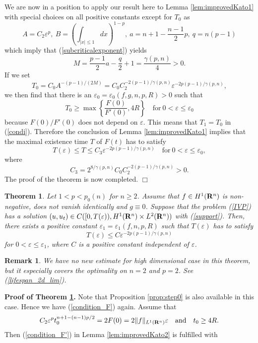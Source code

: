 \documentclass[a4paper,12pt]{article}
\numberwithin{equation}{section}
\def\R{{\bf R}}
\def\e{{\varepsilon}}
\newtheorem{thm}{Theorem}[section]
\newtheorem{rem}{Remark}[section]
\begin{document}
We are now in a position to apply our result here to Lemma \ref{lem:improvedKato1}
with special choices on all positive constants except for $T_0$ as
\[
A=C_2\e^p,\ B=\left(\int_{|x|\le1}dx\right)^{1-p},
\ a=n+1-\frac{n-1}{2}p,\ q=n(p-1)
\]
which imply that (\ref{subcriticalexponent}) yields
\[
M=\frac{p-1}{2}a-\frac{q}{2}+1=\frac{\gamma(p,n)}{4}>0.
\]
If we set
\begin{equation}
\label{condition_T_0}
T_0=C_0A^{-(p-1)/(2M)}=C_0C_2^{-2(p-1)/\gamma(p,n)}\e^{-2p(p-1)/\gamma(p,n)},
\end{equation}
we then find that there is an $\e_0=\e_0(f,g,n,p,R)>0$ such that
\[
T_0\ge\max\left\{\frac{F(0)}{F'(0)},4R\right\}
\quad\mbox{for}\ 0<\e\le\e_0
\] 
because $F(0)/F'(0)$ does not depend on $\e$.
This means that $T_1=T_0$ in (\ref{condi}).
Therefore the conclusion of Lemma \ref{lem:improvedKato1} implies that
the maximal existence time $T$ of $F(t)$ has to satisfy
\[
T(\e)\le T\le C_3\e^{-2p(p-1)/\gamma(p,n)}
\quad\mbox{for}\ 0<\e\le\e_0,
\]
where
\[
C_3=2^{8/\gamma(p,n)}C_0C_2^{-2(p-1)/\gamma(p,n)}>0.
\]
The proof of the theorem is now completed.
\hfill$\Box$
\begin{thm}
\label{thm:main2}
Let $1<p<p_0(n)$ for $n\ge2$.
Assume that $f\in H^1(\R^n)$ is non-negative, does not vanish identically and $g\equiv0$. 
Suppose that the problem {\rm(\ref{IVP})} has a solution
$(u,u_t)\in C([0,T(\e)),H^1(\R^n)\times L^2(\R^n))$ with (\ref{support}).
Then, there exists a positive constant $\e_1=\e_1(f,n,p,R)$ such that $T(\e)$ has to satisfy
\begin{equation}
\label{lifespan2}
T(\e)\le C\e^{-2p(p-1)/\gamma(p,n)}
\end{equation}
for $0<\e\le\e_1$, where $C$ is a positive constant independent of $\e$.
\end{thm}
\begin{rem}
We have no new estimate for high dimensional case in this theorem,
but it especially covers the optimality on $n=2$ and $p=2$.
See (\ref{lifespan_2d_lim}).
\end{rem}
\par\noindent
{\bf Proof of Theorem \ref{thm:main2}.}
Note that Proposition \ref{prop:step0} is also available in this case.
Hence we have (\ref{condition_F}) again.
Assume that
\[
C_2\e^pt_0^{n+1-(n-1)p/2}
=2F(0)=2\|f\|_{L^1(\R^n)}\e
\quad\mbox{and}\quad t_0\ge4R.
\]
Then (\ref{condition_F'}) in Lemma \ref{lem:improvedKato2} is fulfilled with
\end{document}
